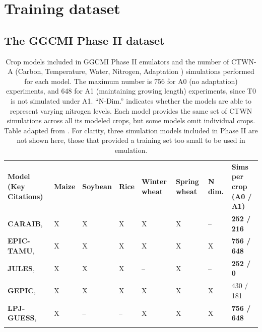 \documentclass[gmd, manuscript]{copernicus} %
\begin{document}
\section{Training dataset}
\label{S:2}
\subsection{The GGCMI Phase II dataset}

\begin{table}[ht]
    \caption{
    Crop models included in GGCMI Phase II emulators and the number of CTWN-A (Carbon, Temperature, Water, Nitrogen, Adaptation ) simulations performed for each model. 
    The maximum number is 756 for A0 (no adaptation) experiments, and 648 for A1 (maintaining growing length) experiments, since T0 is not simulated under A1. 
    ``N-Dim.'' indicates whether the models are able to represent varying nitrogen levels.
    Each model provides the same set of CTWN simulations across all its modeled crops, but some models omit individual crops.
    Table adapted from \citet{franke2019ctwnexperiment}. 
    For clarity, three simulation models included in Phase II are not shown here, those that provided a training set too small to be used in emulation.
    }
    \label{table:models}
    \begin{tabular}{p{6cm} p{1cm} p{1cm} p{1cm} p{1cm} p{1cm} p{1cm} p{1.9cm}}
        \tophline
        \textbf{Model (Key Citations)} & \textbf{Maize} & \textbf{Soybean} & \textbf{Rice} & \textbf{Winter wheat} & \textbf{Spring wheat} & \textbf{N dim.} & \textbf{Sims per crop (A0 / A1)}\\ \middlehline
        \textbf{CARAIB},    \citet{Dury2011, Pirttioja2015}    & X & X & X & X & X & -- & \textbf{252 / 216} \\ \middlehline
        \textbf{EPIC-TAMU}, \citet{Izaurralde06}               & X & X & X & X & X & X & \textbf{756 / 648} \\ \middlehline
        \textbf{JULES},     \citet{Osborne2015, Williams2015, Williams2017} & X & X & X & -- & X & -- & \textbf{252 / 0}\\ \middlehline
        \textbf{GEPIC},     \citet{LIU2007478, FOLBERTH201221} & X & X & X & X & X & X & 430 / 181\\ \middlehline
        \textbf{LPJ-GUESS}, \citet{Lindeskog2013, Olin2015}    & X & -- & -- & X & X & X & \textbf{756 / 648}\\  \middlehline

\end{tabular}
\end{table}
\end{document}
